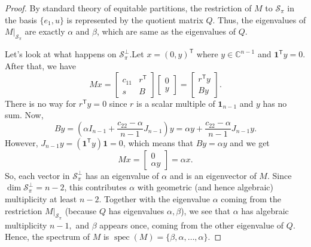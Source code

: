 \documentclass[10pt,a4paper]{amsart}
\begin{document}
\begin{proof}
	\smallskip
	By standard theory of equitable partitions, the restriction of $M$ to $\mathcal{S}_\pi$ in the basis $\{e_1,u\}$ is represented by the quotient matrix $Q$. Thus, the eigenvalues of $M|_{\mathcal{S}_\pi}$ are exactly $\alpha$ and $\beta$, which are same as the eigenvalues of $Q$.
	
	Let's look at what happens on $\mathcal{S}_\pi^\perp$.Let $x=(0,y)^\mathsf{T}$ where $y\in\mathbb{C}^{n-1}$ and $\mathbf{1}^\mathsf{T}y=0$. After that, we have
	$$
	Mx
	=
	\begin{bmatrix}
		c_{11} & r^\mathsf{T}\\
		s & B
	\end{bmatrix}
	\begin{bmatrix}0\\y\end{bmatrix}
	=
	\begin{bmatrix}
		r^\mathsf{T}y\\
		By
	\end{bmatrix}.
	$$
	There is no way for $r^\mathsf{T}y=0$ since $r$ is a scalar multiple of $\mathbf{1}_{n-1}$ and $y$ has no sum. Now,
	$$
	By
	=
	\left(\alpha I_{n-1} + \frac{c_{22}-\alpha}{\,n-1\,}J_{n-1}\right)y
	=
	\alpha y + \frac{c_{22}-\alpha}{\,n-1\,} J_{n-1}y.
	$$
	However, $J_{n-1}y = (\mathbf{1}^\mathsf{T}y)\mathbf{1}=0$, which means that $By=\alpha y$ and we get
	$$
	Mx = \begin{bmatrix}0\\ \alpha y\end{bmatrix} = \alpha x.
	$$
	So, each vector in $\mathcal{S}_\pi^\perp$ has an eigenvalue of $\alpha$ and is an eigenvector of $M$. Since $\dim\mathcal{S}_\pi^\perp = n-2$, this contributes $\alpha$ with geometric (and hence algebraic) multiplicity at least $n-2$. Together with the eigenvalue $\alpha$ coming from the restriction $M|_{\mathcal{S}_\pi}$ (because $Q$ has eigenvalues $\alpha,\beta$), we see that $\alpha$  has algebraic multiplicity $n-1,$	and $\beta$ appears once, coming from the other eigenvalue of $Q$. Hence, the spectrum of $M$ is  $\operatorname{spec}(M)=\{\beta,\alpha,\dots,\alpha\}.$
	

\end{proof}
\end{document}
